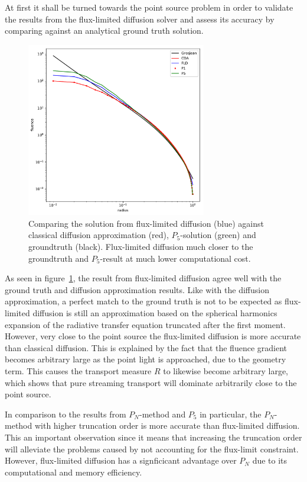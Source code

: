 At first it shall be turned towards the point source problem in order to validate the results from the flux-limited diffusion solver and assess its accuracy by comparing against an analytical ground truth solution.
\begin{figure}[h]
\centering
\includegraphics[width=0.7\textwidth]{06_fld/results/fld_result_plot_pointsource.pdf}
\caption{Comparing the solution from flux-limited diffusion (blue) against classical diffusion approximation (red), $P_5$-solution (green) and groundtruth (black). Flux-limited diffusion much closer to the groundtruth and $P_5$-result at much lower computational cost.}
\label{fig:fld_results_pointsource_1}
\end{figure}
As seen in figure~\ref{fig:fld_results_pointsource_1}, the result from flux-limited diffusion agree well with the ground truth and diffusion approximation results. Like with the diffusion approximation, a perfect match to the ground truth is not to be expected as flux-limited diffusion is still an approximation based on the spherical harmonics expansion of the radiative transfer equation truncated after the first moment. However, very close to the point source the flux-limited diffusion is more accurate than classical diffusion. This is explained by the fact that the fluence gradient becomes arbitrary large as the point light is approached, due to the geometry term. This causes the transport measure $R$ to likewise become arbitrary large, which shows that pure streaming transport will dominate arbitrarily close to the point source.

In comparison to the results from $P_N$-method and $P_5$ in particular, the $P_N$-method with higher truncation order is more accurate than flux-limited diffusion. This an important observation since it means that increasing the truncation order will alleviate the problems caused by not accounting for the flux-limit constraint. However, flux-limited diffusion has a signficicant advantage over $P_N$ due to its computational and memory efficiency.

